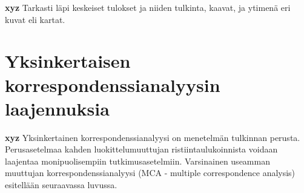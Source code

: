 \documentclass[finnish,]{book}
\begin{document}
\textbf{xyz} Tarkasti läpi keskeiset tulokset ja niiden tulkinta,
kaavat, ja ytimenä eri kuvat eli kartat.

\hypertarget{yksinkertaisen-korrespondenssianalyysin-laajennuksia}{%
\chapter{Yksinkertaisen korrespondenssianalyysin
laajennuksia}\label{yksinkertaisen-korrespondenssianalyysin-laajennuksia}}

\textbf{xyz} Yksinkertainen korrespondenssianalyysi on menetelmän
tulkinnan perusta. Perusasetelmaa kahden luokittelumuuttujan
ristiintaulukoinnista voidaan laajentaa monipuolisempiin
tutkimusasetelmiin. Varsinainen useamman muuttujan
korrespondenssianalyysi (MCA - multiple correspondence analysis)
esitellään seuraavassa luvussa.


\end{document}
